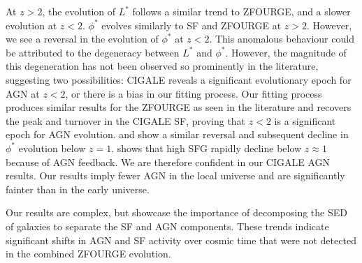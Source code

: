 At $z>2$, the evolution of $L^{*}$ follows a similar trend to ZFOURGE, and a slower evolution at $z<2$. $\phi^{*}$ evolves similarly to SF and ZFOURGE at $z>2$. However, we see a reversal in the evolution of $\phi^{*}$ at $z<2$. This anomalous behaviour could be attributed to the degeneracy between $L^{*}$ and $\phi^{*}$. However, the magnitude of this degeneration has not been observed so prominently in the literature, suggesting two possibilities: CIGALE reveals a significant evolutionary epoch for AGN at $z<2$, or there is a bias in our fitting process. Our fitting process produces similar results for the ZFOURGE as seen in the literature and recovers the peak and turnover in the CIGALE SF, proving that $z<2$ is a significant epoch for AGN evolution. \cite{hopkins_observational_2007} and \cite{delvecchio_tracing_2014} show a similar reversal and subsequent decline in $\phi^{*}$ evolution below $z=1$. \cite{katsianis_evolution_2017} shows that high SFG rapidly decline below $z\approx1$ because of AGN feedback. We are therefore confident in our CIGALE AGN results. Our results imply fewer AGN in the local universe and are significantly fainter than in the early universe. 

Our results are complex, but showcase the importance of decomposing the SED of galaxies to separate the SF and AGN components. These trends indicate significant shifts in AGN and SF activity over cosmic time that were not detected in the combined ZFOURGE evolution.



